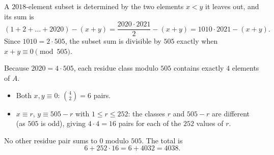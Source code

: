 A $2018$-element subset is determined by the two elements $x<y$ it leaves out, and its sum is
\[
(1+2+\dots+2020)-(x+y)=\dfrac{2020\cdot2021}{2}-(x+y)=1010\cdot2021-(x+y).
\]
Since $1010=2\cdot505$, the subset sum is divisible by $505$ exactly when $x+y\equiv0\pmod{505}$.

Because $2020=4\cdot505$, each residue class modulo $505$ contains exactly $4$ elements of $A$.
\begin{itemize}
\item Both $x,y\equiv0$: $\binom42=6$ pairs.
\item $x\equiv r$, $y\equiv 505-r$ with $1\le r\le252$: the classes $r$ and $505-r$ are different (as $505$ is odd), giving $4\cdot4=16$ pairs for each of the $252$ values of $r$.
\end{itemize}
No other residue pair sums to $0$ modulo $505$. The total is
\[6+252\cdot16=6+4032=\boxed{4038}.\]
